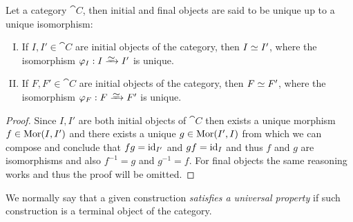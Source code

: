 \begin{proposition}\label{prop:initial-final-unique}
    Let a category \(\cat{C}\), then initial and final objects are said to be
    unique up to a unique isomorphism:
    \begin{enumerate}[I.]
        \item If \(I, I' \in \cat{C}\) are initial objects of the
              category, then \(I \simeq I'\), where the isomorphism \(\varphi_I: I
              \isoto I'\) is unique.
        \item If \(F, F' \in \cat{C}\) are initial objects of the
              category, then \(F \simeq F'\), where the isomorphism \(\varphi_F: F
              \isoto F'\) is unique.
    \end{enumerate}
\end{proposition}

\begin{proof}
    Since \(I, I'\) are both initial objects of \(\cat{C}\) then exists a unique
    morphism \(f \in \operatorname{Mor}(I, I')\) and there exists a unique \(g \in \operatorname{Mor}(I',
    I)\) from which we can compose and conclude that \(f g = \operatorname{id}_{I'}\) and \(gf =
    \operatorname{id}_{I}\) and thus \(f\) and \(g\) are isomorphisms and also \(f^{-1} = g\) and
    \(g^{-1} = f\).  For final objects the same reasoning works and thus the proof
    will be omitted.
\end{proof}

We normally say that a given construction \emph{satisfies a universal property}
if such construction is a terminal object of the category.
